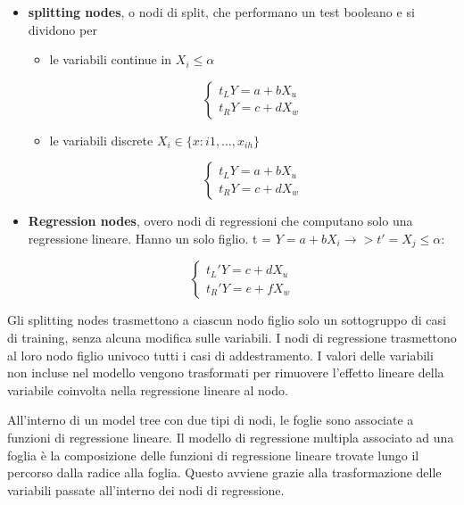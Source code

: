 \documentclass[a4paper]{extarticle}
\begin{document}
\begin{itemize}
\item \textbf{splitting nodes}, o nodi di split, che performano un test booleano e si dividono per

\begin{itemize}
\item le variabili continue in $X_i \leq \alpha$

\begin{equation}
\begin{cases}
		t_L Y=a+bX_u \\
		t_R Y = c + dX_w
	\end{cases}
\end{equation}

\item le variabili discrete $X_i \in \{x:{i1},\dots,x_{ih}\}$

\begin{equation}
\begin{cases}
		t_L Y=a+bX_u \\
		t_R Y = c + dX_w
	\end{cases}
\end{equation}

\end{itemize}

\item \textbf{Regression nodes}, overo nodi di regressioni che computano solo una regressione lineare. Hanno un solo figlio. t = $Y= a+ bX_i \rightarrow > t' =  X_j \leq \alpha$:

\begin{equation}
\begin{cases}
		t_L' Y=c + dX_u \\
		t_R' Y = e + fX_w
	\end{cases}
\end{equation}

\end{itemize}

Gli splitting nodes trasmettono a ciascun nodo figlio solo un sottogruppo di casi di training, senza alcuna modifica sulle variabili. I nodi di regressione trasmettono al loro nodo figlio univoco tutti i casi di addestramento. I valori delle variabili non incluse nel modello vengono trasformati per rimuovere l'effetto lineare della variabile coinvolta nella regressione lineare al nodo.

All'interno di un model tree con due tipi di nodi, le foglie sono associate a funzioni di regressione lineare. Il modello di regressione multipla associato ad una foglia è la composizione delle funzioni di regressione lineare trovate lungo il percorso dalla radice alla foglia. Questo avviene grazie alla trasformazione delle variabili passate all'interno dei nodi di regressione.
\end{document}
